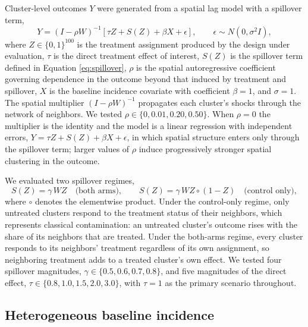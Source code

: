 \documentclass[11pt]{article}
\begin{document}
Cluster-level outcomes \(Y\) were generated from a spatial lag model
with a spillover term, \begin{equation}
Y = (I - \rho W)^{-1}\left[\tau Z + S(Z) + \beta X + \epsilon\right], \qquad \epsilon \sim N(0, \sigma^2 I),
\label{eq:outcome}
\end{equation} where \(Z \in \{0,1\}^{100}\) is the treatment assignment
produced by the design under evaluation, \(\tau\) is the direct
treatment effect of interest, \(S(Z)\) is the spillover term defined in
Equation \ref{eq:spillover}, \(\rho\) is the spatial autoregressive
coefficient governing dependence in the outcome beyond that induced by
treatment and spillover, \(X\) is the baseline incidence covariate with
coefficient \(\beta = 1\), and \(\sigma = 1\). The spatial multiplier
\((I-\rho W)^{-1}\) propagates each cluster's shocks through the network
of neighbors. We tested \(\rho \in \{0, 0.01, 0.20, 0.50\}\). When
\(\rho = 0\) the multiplier is the identity and the model is a linear
regression with independent errors,
\(Y = \tau Z + S(Z) + \beta X + \epsilon\), in which spatial structure
enters only through the spillover term; larger values of \(\rho\) induce
progressively stronger spatial clustering in the outcome.

We evaluated two spillover regimes, \begin{equation}
S(Z) = \gamma\, WZ \quad \text{(both arms)}, \qquad S(Z) = \gamma\, WZ \circ (1 - Z) \quad \text{(control only)},
\label{eq:spillover}
\end{equation} where \(\circ\) denotes the elementwise product. Under
the control-only regime, only untreated clusters respond to the
treatment status of their neighbors, which represents classical
contamination: an untreated cluster's outcome rises with the share of
its neighbors that are treated. Under the both-arms regime, every
cluster responds to its neighbors' treatment regardless of its own
assignment, so neighboring treatment adds to a treated cluster's own
effect. We tested four spillover magnitudes,
\(\gamma \in \{0.5, 0.6, 0.7, 0.8\}\), and five magnitudes of the direct
effect, \(\tau \in \{0.8, 1.0, 1.5, 2.0, 3.0\}\), with \(\tau = 1\) as
the primary scenario throughout.

\subsection{Heterogeneous baseline
incidence}\label{heterogeneous-baseline-incidence}
\end{document}
